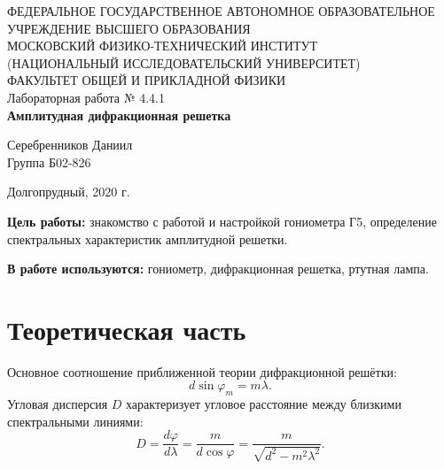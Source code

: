 \documentclass[a4paper,12pt]{article} %
\begin{document}
\begin{center}
	\footnotesize{ФЕДЕРАЛЬНОЕ ГОСУДАРСТВЕННОЕ АВТОНОМНОЕ ОБРАЗОВАТЕЛЬНОЕ 			УЧРЕЖДЕНИЕ ВЫСШЕГО ОБРАЗОВАНИЯ}\\
	\footnotesize{МОСКОВСКИЙ ФИЗИКО-ТЕХНИЧЕСКИЙ ИНСТИТУТ\\(НАЦИОНАЛЬНЫЙ 			ИССЛЕДОВАТЕЛЬСКИЙ УНИВЕРСИТЕТ)}\\
	\footnotesize{ФАКУЛЬТЕТ ОБЩЕЙ И ПРИКЛАДНОЙ ФИЗИКИ\\}
	\hfill \break
	\hfill\break
	\hfill\break
	\hfill \break
	\hfill \break
	\hfill \break
	\hfill \break
	\hfill \break
	\hfill \break
	\hfill \break
	\hfill \break
	\hfill \break
	\hfill \break
	\hfill \break
	\large{Лабораторная работа № 4.4.1 \\\textbf{Амплитудная дифракционная решетка}}\\
	\hfill \break
	\hfill \break
	\hfill \break
	\begin{flushright}
		Серебренников Даниил\\
		Группа Б02-826
	\end{flushright}
	\hfill \break
	\hfill \break
	\hfill \break
	\hfill \break
	\hfill \break
	\hfill \break
	\hfill \break
	\hfill \break
	\hfill \break
	\hfill \break
	\hfill \break
\end{center}
\begin{center}
	Долгопрудный, 2020 г.
\end{center}
\thispagestyle{empty}
\newpage
	\textbf{Цель работы:} знакомство с работой и настройкой гониометра Г5, определение спектральных характеристик амплитудной решетки.

	\textbf{В работе используются:}  гониометр, дифракционная решетка, ртутная лампа.
\section{Теоретическая часть}
	\noindent Основное соотношение приближенной теории дифракционной решётки:
	\begin{equation}
	d\sin \varphi_m = m\lambda.
	\end{equation}
	Угловая дисперсия $D$ характеризует угловое расстояние между близкими спектральными линиями:
	\begin{equation}
	D = \frac{d\varphi}{d\lambda} = \frac{m}{d \cos \varphi}=\frac{m}{\sqrt{d^{2}-m^{2} \lambda^{2}}}.
	\end{equation}
	
\end{document}

